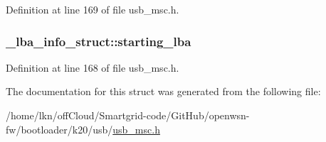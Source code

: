 Definition at line 169 of file usb\+\_\+msc.\+h.

\subsubsection[{\texorpdfstring{starting\+\_\+lba}{starting_lba}}]{ \+\_\+lba\+\_\+info\+\_\+struct\+::starting\+\_\+lba}\hypertarget{struct__lba__info__struct_ac9fe7fe181a4a1d194842271c5da83a9}{}\label{struct__lba__info__struct_ac9fe7fe181a4a1d194842271c5da83a9}


Definition at line 168 of file usb\+\_\+msc.\+h.



The documentation for this struct was generated from the following file\+:\begin{DoxyCompactItemize}
\item 
/home/lkn/off\+Cloud/\+Smartgrid-\/code/\+Git\+Hub/openwsn-\/fw/bootloader/k20/usb/\hyperlink{usb__msc_8h}{usb\+\_\+msc.\+h}\end{DoxyCompactItemize}
